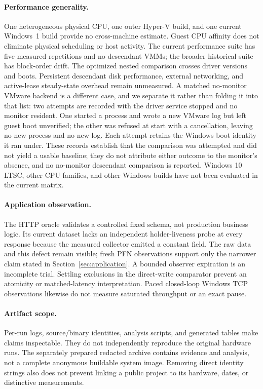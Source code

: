 \paragraph{Performance generality.}
One heterogeneous physical CPU, one outer Hyper-V build, and one current
Windows~1 build provide no cross-machine estimate. Guest CPU affinity does not
eliminate physical scheduling or host activity. The current performance suite
has five measured repetitions and no descendant VMMs; the broader historical
suite has block-order drift. The optimized nested comparison crosses driver
versions and boots. Persistent descendant disk performance, external networking,
and active-lease steady-state overhead remain unmeasured. A matched no-monitor
VMware backend is a different case, and we separate it rather than folding it
into that list: two attempts are recorded with the driver service stopped and no
monitor resident. One started a  process and wrote a new VMware
log but left guest boot unverified; the other was refused at start with a
cancellation, leaving no new process and no new log. Each attempt retains the
Windows boot identity it ran under. These records establish that the comparison
was attempted and did not yield a usable baseline; they do not attribute either
outcome to the monitor's absence, and no no-monitor descendant comparison is
reported. Windows 10 LTSC, other CPU families, and other Windows builds
have not been evaluated in the current matrix.

\paragraph{Application observation.}
The HTTP oracle validates a controlled fixed schema, not production business
logic. Its current dataset lacks an independent holder-liveness probe at every
response because the measured collector emitted a constant field. The raw data
and this defect remain visible; fresh PFN observations support only the narrower
claim stated in Section~\ref{sec:application}. A bounded observer expiration is
an incomplete trial. Settling exclusions in the direct-write comparator prevent
an atomicity or matched-latency interpretation. Paced closed-loop Windows TCP
observations likewise do not measure saturated throughput or an exact pause.

\paragraph{Artifact scope.}
Per-run logs, source/binary identities, analysis scripts, and generated tables
make claims inspectable. They do not independently reproduce the original
hardware runs. The separately prepared redacted archive contains evidence and
analysis, not a complete anonymous buildable system image. Removing direct
identity strings also does not prevent linking a public project to its hardware,
dates, or distinctive measurements.

